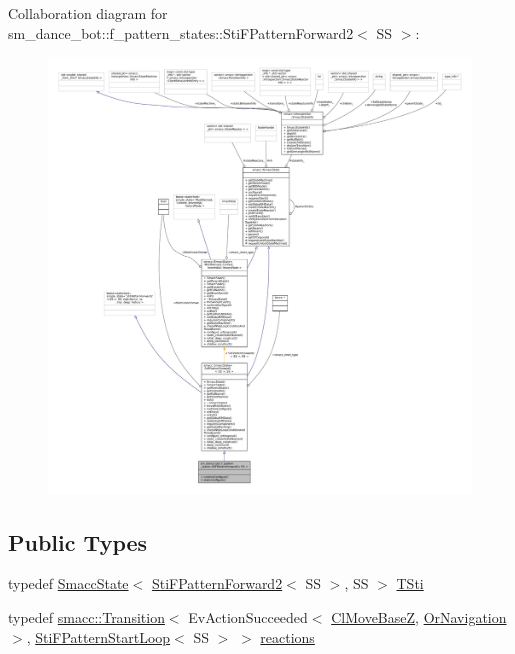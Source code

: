 Collaboration diagram for sm\+\_\+dance\+\_\+bot\+:\+:f\+\_\+pattern\+\_\+states\+:\+:Sti\+F\+Pattern\+Forward2$<$ SS $>$\+:
\nopagebreak
\begin{figure}[H]
\begin{center}
\leavevmode
\includegraphics[width=350pt]{structsm__dance__bot_1_1f__pattern__states_1_1StiFPatternForward2__coll__graph}
\end{center}
\end{figure}
\subsection*{Public Types}
\begin{DoxyCompactItemize}
\item 
typedef \hyperlink{classSmaccState}{Smacc\+State}$<$ \hyperlink{structsm__dance__bot_1_1f__pattern__states_1_1StiFPatternForward2}{Sti\+F\+Pattern\+Forward2}$<$ SS $>$, SS $>$ \hyperlink{structsm__dance__bot_1_1f__pattern__states_1_1StiFPatternForward2_a9579984c93060baa23d437238b0b2f9e}{T\+Sti}
\item 
typedef \hyperlink{classsmacc_1_1Transition}{smacc\+::\+Transition}$<$ Ev\+Action\+Succeeded$<$ \hyperlink{classmove__base__z__client_1_1ClMoveBaseZ}{Cl\+Move\+BaseZ}, \hyperlink{classsm__dance__bot_1_1OrNavigation}{Or\+Navigation} $>$, \hyperlink{structsm__dance__bot_1_1f__pattern__states_1_1StiFPatternStartLoop}{Sti\+F\+Pattern\+Start\+Loop}$<$ SS $>$ $>$ \hyperlink{structsm__dance__bot_1_1f__pattern__states_1_1StiFPatternForward2_ac4a0678717e5fa1506d64369bd35f09d}{reactions}
\end{DoxyCompactItemize}

